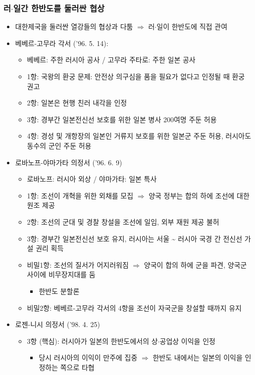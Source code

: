 \subsubsection*{러$\cdot$일간 한반도를 둘러싼 협상}
\begin{itemize}
    \item 대한제국을 둘러싼 열강들의 협상과 다툼 $\Rightarrow$ 러$\cdot$일이 한반도에 직접 관여
    \item 베베르-고무라 각서 ('96. 5. 14):
    \begin{itemize}
        \item 베베르: 주한 러시아 공사 / 고무라 주타로: 주한 일본 공사
        \item 1항: 국왕의 환궁 문제: 안전상 의구심을 품을 필요가 없다고 인정될 때 환궁 권고
        \item 2항: 일본은 현행 친러 내각을 인정
        \item 3항: 경부간 일본전신선 보호를 위한 일본 병사 200여명 주둔 허용
        \item 4항: 경성 및 개항장의 일본인 거류지 보호를 위한 일본군 주둔 허용, 러시아도 동수의 군인 주둔 허용
    \end{itemize}
    \item 로바노프-야마가타 의정서 ('96. 6. 9)
    \begin{itemize}
    \item 로바노프: 러시아 외상 / 야마가타: 일본 특사
    \item 1항: 조선이 개혁을 위한 외채를 모집 $\Rightarrow$ 양국 정부는 합의 하에 조선에 대한 원조 제공
    \item 2항: 조선의 군대 및 경찰 창설을 조선에 일임, 외부 재원 제공 불허
    \item 3항: 경부간 일본전신선 보호 유지, 러시아는 서울 \textasciitilde{} 러시아 국경 간 전신선 가설 권리 획득
    \item 비밀1항: 조선의 질서가 어지러워짐 $\Rightarrow$ 양국이 합의 하에 군을 파견, 양국군 사이에 비무장지대를 둠
    \begin{itemize}
        \item 한반도 분할론
    \end{itemize}
    \item 비밀2항: 베베르-고무라 각서의 4항을 조선이 자국군을 창설할 때까지 유지
    \end{itemize}
    \item 로젠-니시 의정서 ('98. 4. 25)
    \begin{itemize}
        \item 3항 (핵심): 러시아가 일본의 한반도에서의 상$\cdot$공업상 이익을 인정
        \begin{itemize}
            \item 당시 러시아의 이익이 만주에 집중 $\Rightarrow$ 한반도 내에서는 일본의 이익을 인정하는 쪽으로 타협
        \end{itemize}
    \end{itemize}
\end{itemize}
